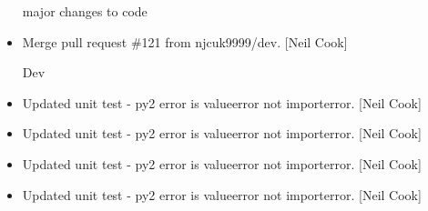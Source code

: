 \documentclass[a4paper,10pt,english]{report}
\begin{document}
\begin{itemize}
major changes to code

\item {} 
Merge pull request \#121 from njcuk9999/dev. {[}Neil Cook{]}

Dev

\item {} 
Updated unit test - py2 error is valueerror not importerror. {[}Neil
Cook{]}

\item {} 
Updated unit test - py2 error is valueerror not importerror. {[}Neil
Cook{]}

\item {} 
Updated unit test - py2 error is valueerror not importerror. {[}Neil
Cook{]}

\item {} 
Updated unit test - py2 error is valueerror not importerror. {[}Neil
Cook{]}

\end{itemize}
\end{document}

